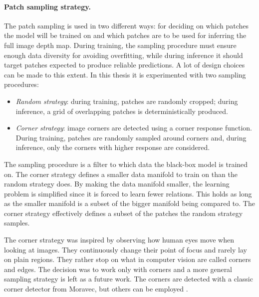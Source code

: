 \paragraph{Patch sampling strategy.}
The patch sampling is used in two different ways: for deciding on which patches the model will be trained on and which patches are to be used for inferring the full image depth map. 
During training, the sampling procedure must ensure enough data diversity for avoiding overfitting, while during inference it should target patches expected to produce reliable predictions.
A lot of design choices can be made to this extent.
In this thesis it is experimented with two sampling procedures:
\begin{itemize}
    \item{
        \textit{Random strategy}: during training, patches are randomly cropped; during inference, a grid of overlapping patches is deterministically produced.}
    \item{
        \textit{Corner strategy}: image corners are detected using a corner response function.
        During training, patches are randomly sampled around corners and, during inference, only the corners with higher response are considered.
    }
\end{itemize}
The sampling procedure is a filter to which data the black-box model is trained on.
The corner strategy defines a smaller data manifold to train on than the random strategy does.
By making the data manifold smaller, the learning problem is simplified since it is forced to learn fewer relations.
This holds as long as the smaller manifold is a subset of the bigger manifold being compared to.
The corner strategy effectively defines a subset of the patches the random strategy samples.

The corner strategy was inspired by observing how human eyes move when looking at images.
They continuously change their point of focus and rarely lay on plain regions.
They rather stop on what in computer vision are called corners and edges.
The decision was to work only with corners and a more general sampling strategy is left as a future work.
The corners are detected with a classic corner detector from Moravec, but others can be employed \cite{computer_vision}.

